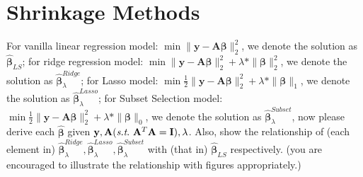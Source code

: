 \documentclass[11pt]{article}
\newcommand{\mtx}[1]{\mathbf{#1}}
\newcommand{\vct}[1]{\mathbf{#1}}
\def \mA {\mtx{A}}
\def \mI {\mtx{I}}
\def \vy {\vct{y}}
\begin{document}
\section*{Shrinkage Methods}
For vanilla linear regression model: $\min \|\vy-\mA\bm{\beta}\|_2^2$, 
we denote the solution as $\hat{\bm{\beta}}_{LS}$; for ridge regression model: $\min \|\vy-\mA\bm{\beta}\|_2^2+\lambda*\|\bm{\beta}\|_2^2$, we denote the solution as $\hat{\bm{\beta}}_\lambda^{Ridge}$; for Lasso model: $\min \frac{1}{2}\|\vy-\mA\bm{\beta}\|_2^2+\lambda*\|\bm{\beta}\|_1$, we denote the solution as $\hat{\bm{\beta}}_\lambda^{Lasso}$; for Subset Selection model:  $\min \frac{1}{2}\|\vy-\mA\bm{\beta}\|_2^2+\lambda*\|\bm{\beta}\|_0$, we denote the solution as $\hat{\bm{\beta}}_\lambda^{Subset}$, now please derive each $\hat{\bm{\beta}}$ given $\vy, \mA  (\st \ \mA^T\mA=\mI), \lambda$. Also, show the relationship of (each element in) $\hat{\bm{\beta}}_\lambda^{Ridge}, \hat{\bm{\beta}}_\lambda^{Lasso}, \hat{\bm{\beta}}_\lambda^{Subset}$ with (that in) $\hat{\bm{\beta}}_{LS}$ respectively. (you are encouraged to illustrate the relationship with figures appropriately.)
\vspace{4cm}
\end{document}
